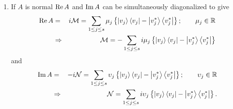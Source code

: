 \begin{enumerate}
\item If $A$ is normal $%
\mathop{\rm Re}%
A$ and $%
\mathop{\rm Im}%
A$ can be simultaneously diagonalized to give 
\begin{eqnarray}
\mathop{\rm Re}%
A &=&i{\cal M}=\sum_{1\leq j\leq s}\mu _{j}\left\{ \left\vert
v_{j}\right\rangle \left\langle v_{j}\right\vert -\left\vert v_{j}^{\ast
}\right\rangle \left\langle v_{j}^{\ast }\right\vert \right\} ;\qquad \mu
_{j}\in {\Bbb R}  \nonumber \\
&\Rightarrow &{\cal M}={\cal -}\sum_{1\leq j\leq s}i\mu _{j}\left\{
\left\vert v_{j}\right\rangle \left\langle v_{j}\right\vert -\left\vert
v_{j}^{\ast }\right\rangle \left\langle v_{j}^{\ast }\right\vert \right\}
\end{eqnarray}%
and 
\begin{eqnarray}
\mathop{\rm Im}%
A &=&-i{\cal N}=\sum_{1\leq j\leq s}\upsilon _{j}\left\{ \left\vert
v_{j}\right\rangle \left\langle v_{j}\right\vert -\left\vert v_{j}^{\ast
}\right\rangle \left\langle v_{j}^{\ast }\right\vert \right\} ;\qquad
\upsilon _{j}\in {\Bbb R}  \nonumber \\
&\Rightarrow &{\cal N}=\sum_{1\leq j\leq s}i\upsilon _{j}\left\{ \left\vert
v_{j}\right\rangle \left\langle v_{j}\right\vert -\left\vert v_{j}^{\ast
}\right\rangle \left\langle v_{j}^{\ast }\right\vert \right\} .
\end{eqnarray}
\end{enumerate}


